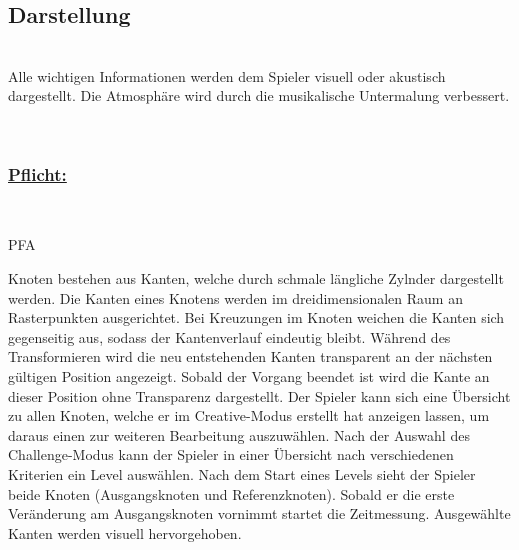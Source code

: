 %
%


\subsection{Darstellung}

%
%
\renewcommand{\K}{}
%
%

~\\
Alle wichtigen Informationen werden dem Spieler visuell oder akustisch dargestellt. Die Atmosphäre wird durch die musikalische Untermalung verbessert.

~\\

%
%
\subsubsection*{\underline{Pflicht:}}~\\

\begin{ids}{\gls{PFA\K}}

	\id[ 280] Knoten bestehen aus Kanten, welche durch schmale längliche Zylnder dargestellt werden.
	\id[ 290] Die Kanten eines Knotens werden im dreidimensionalen Raum an Rasterpunkten ausgerichtet.
	\id[ 300] Bei Kreuzungen im Knoten weichen die Kanten sich gegenseitig aus, sodass der Kantenverlauf eindeutig bleibt.
	\id[ 310] Während des Transformieren wird die neu entstehenden Kanten transparent an der nächsten gültigen Position angezeigt. Sobald der Vorgang beendet ist wird die Kante an dieser Position ohne Transparenz dargestellt.
	\id[ 320] Der Spieler kann sich eine Übersicht zu allen Knoten, welche er im Creative-Modus erstellt hat anzeigen lassen, um daraus einen zur weiteren Bearbeitung auszuwählen.
	\id[ 330] Nach der Auswahl des Challenge-Modus kann der Spieler in einer Übersicht nach verschiedenen Kriterien ein Level auswählen.
	\id[ 340] Nach dem Start eines Levels sieht der Spieler beide Knoten (Ausgangsknoten und Referenzknoten). Sobald er die erste Veränderung am Ausgangsknoten vornimmt startet die Zeitmessung.
	\id[ 350] Ausgewählte Kanten werden visuell hervorgehoben.
	
	
 	
 	
	
\end{ids}

~\\


